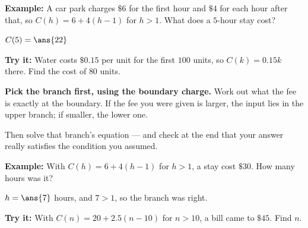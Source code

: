 \documentclass[12pt]{article}
\begin{document}
\begin{examplebox}
\textbf{Example:} \quad A car park charges $\$6$ for the first hour and $\$4$ for each hour after that, so $C(h) = 6 + 4(h-1)$ for $h > 1$. What does a $5$-hour stay cost?
\par
$C(5) = \ans{22}$
\end{examplebox}

\begin{tryitbox}
\textbf{Try it:} \quad Water costs $\$0.15$ per unit for the first $100$ units, so $C(k) = 0.15k$ there. Find the cost of $80$ units.\\[2pt]
\end{tryitbox}


\begin{formulabox}
\textbf{Pick the branch first, using the boundary charge.} Work out what the fee is exactly at the boundary. If the fee you were given is larger, the input lies in the upper branch; if smaller, the lower one.\par\smallskip
Then solve that branch's equation --- and check at the end that your answer really satisfies the condition you assumed.
\end{formulabox}

\begin{examplebox}
\textbf{Example:} \quad With $C(h) = 6 + 4(h-1)$ for $h > 1$, a stay cost $\$30$. How many hours was it?
\par
$h = \ans{7}$ hours, and $7 > 1$, so the branch was right.
\end{examplebox}

\begin{tryitbox}
\textbf{Try it:} \quad With $C(n) = 20 + 2.5(n-10)$ for $n > 10$, a bill came to $\$45$. Find $n$.\\[2pt]
\end{tryitbox}
\end{document}
